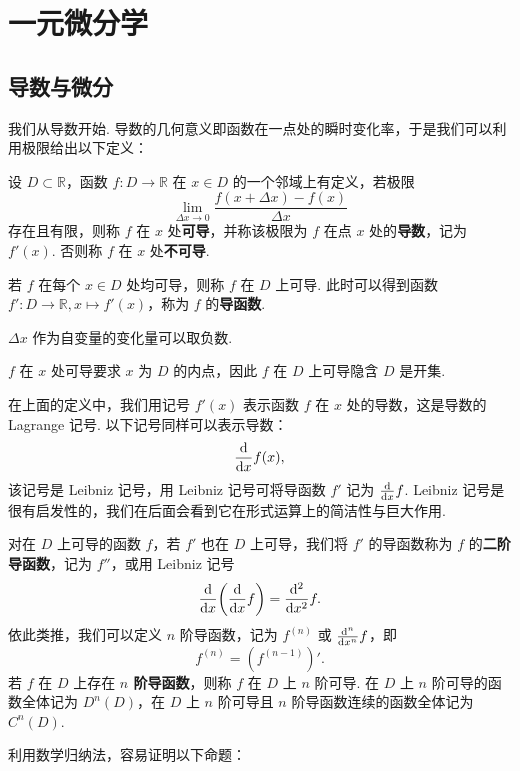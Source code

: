 \documentclass[../main.tex]{subfiles}
\begin{document}
\chapter{一元微分学}

\section{导数与微分}

我们从导数开始. 导数的几何意义即函数在一点处的瞬时变化率，于是我们可以利用极限给出以下定义：

\begin{definition}[导数的定义] \label{def:derivative}
    设 $D \subset \mathbb R$，函数 $f:D \to \mathbb R$ 在 $x \in D$ 的一个邻域上有定义，若极限 
    $$
    \lim_{\Delta x \to 0} \frac{f(x + \Delta x) - f(x)}{\Delta x}
    $$ 
    存在且有限，则称 $f$ 在 $x$ 处\textbf{可导}，并称该极限为 $f$ 在点 $x$ 处的\textbf{导数}，记为 $f'(x)$. 否则称 $f$ 在 $x$ 处\textbf{不可导}. 
    
    若 $f$ 在每个 $x \in D$ 处均可导，则称 $f$ 在 $D$ 上可导. 此时可以得到函数 $f':D \to \mathbb R, x \mapsto f'(x)$，称为 $f$ 的\textbf{导函数}. 
\end{definition}

\begin{remark}
    $\Delta x$ 作为自变量的变化量可以取负数. 

    $f$ 在 $x$ 处可导要求 $x$ 为 $D$ 的内点，因此 $f$ 在 $D$ 上可导隐含 $D$ 是开集. 
\end{remark}

在上面的定义中，我们用记号 $f'(x)$ 表示函数 $f$ 在 $x$ 处的导数，这是导数的 Lagrange 记号. 以下记号同样可以表示导数：
$$
\frac{\mathrm{d}}{\mathrm{d} x} f(x), 
$$
该记号是 Leibniz 记号，用 Leibniz 记号可将导函数 $f'$ 记为 $\frac{\mathrm{d}}{\mathrm{d} x} f$. Leibniz 记号是很有启发性的，我们在后面会看到它在形式运算上的简洁性与巨大作用. 

对在 $D$ 上可导的函数 $f$，若 $f'$ 也在 $D$ 上可导，我们将 $f'$ 的导函数称为 $f$ 的\textbf{二阶导函数}，记为 $f''$，或用 Leibniz 记号
$$
\frac{\mathrm{d}}{\mathrm{d} x} \bigg(\frac{\mathrm{d}}{\mathrm{d} x} f \bigg) = \frac{\mathrm{d}^2}{\mathrm{d} x^2} f. 
$$
依此类推，我们可以定义 $n$ 阶导函数，记为 $f^{(n)}$ 或 $\frac{\mathrm{d}^n}{\mathrm{d} x^n} f$，即
$$
f^{(n)} = (f^{(n - 1)})'. 
$$
若 $f$ 在 $D$ 上存在 \textbf{$n$ 阶导函数}，则称 $f$ 在 $D$ 上 $n$ 阶可导. 在 $D$ 上 $n$ 阶可导的函数全体记为 $D^n(D)$，在 $D$ 上 $n$ 阶可导且 $n$ 阶导函数连续的函数全体记为 $C^n(D)$. 

利用数学归纳法，容易证明以下命题：
\end{document}
